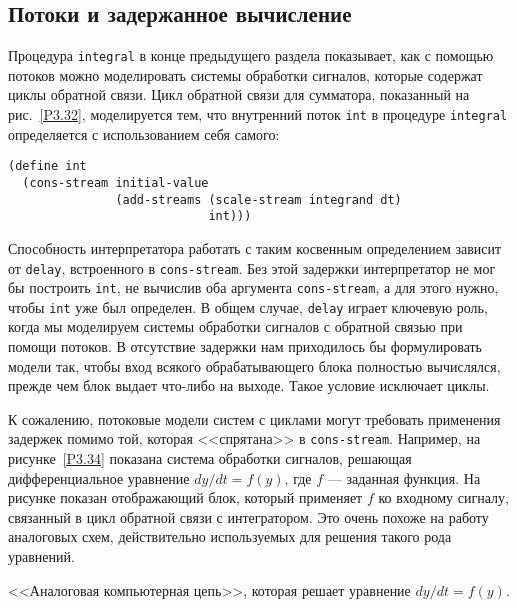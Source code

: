 \subsection{Потоки и задержанное вычисление}
\label{STREAMS-AND-DELAYED-EVALUATION}


%
%
Процедура {\tt integral} в конце предыдущего
раздела  показывает, как с помощью потоков можно моделировать системы
обработки сигналов, которые содержат
циклы обратной связи.  Цикл
обратной связи для сумматора, показанный на
рис.~\ref{P3.32}, моделируется тем, что внутренний поток
{\tt int} в процедуре {\tt integral} определяется с
использованием себя самого:

\begin{Verbatim}[fontsize=\small]
(define int
  (cons-stream initial-value
               (add-streams (scale-stream integrand dt)
                            int)))
\end{Verbatim}
Способность интерпретатора работать с таким косвенным определением
зависит от {\tt delay}, встроенного в
{\tt cons-stream}.  Без этой задержки интерпретатор не мог бы
построить {\tt int}, не вычислив оба аргумента
{\tt cons-stream}, а для этого нужно, чтобы {\tt int}
уже был определен.  В общем случае, {\tt delay} играет ключевую
роль, когда мы моделируем системы обработки сигналов с обратной связью
при помощи потоков.  В отсутствие задержки нам приходилось бы
формулировать модели так, чтобы вход всякого обрабатывающего блока
полностью вычислялся, прежде чем блок выдает что-либо на выходе.  Такое
условие исключает циклы.

К сожалению, потоковые модели систем с циклами могут
требовать применения задержек помимо той, которая <<спрятана>> в
{\tt cons-stream}.  Например, на
рисунке~\ref{P3.34} показана система обработки сигналов, решающая
дифференциальное уравнение $dy/dt = f(y)$, где
$f$ --- заданная функция.  На рисунке показан отображающий
блок, который применяет $f$ ко входному сигналу, связанный
в цикл обратной связи с интегратором. Это очень похоже на работу
аналоговых схем, действительно используемых для решения
такого рода уравнений.


\begin{cntrfig}

\caption{<<Аналоговая компьютерная цепь>>,
которая решает уравнение $dy/dt = f(y)$.}
\label{P3.34}
\end{cntrfig}

